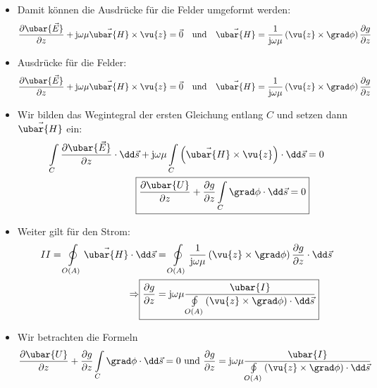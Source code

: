 \begin{itemize}
	\item Damit können die Ausdrücke für die Felder umgeformt werden:
	\begin{equation}
		\frac{\partial \ubar{\vec{E}}}{\partial z} + \mathrm{j}\omega\mu\vec{\ubar{H}} \times\vu{z} =\vec{0} \quad\text{und}\quad \vec{\ubar{H}}= \frac{1}{\mathrm{j}\omega\mu} \left(\vu{z}\times\grad \phi\right)\frac{\partial g}{\partial z}
	\end{equation}
	\item Ausdrücke für die Felder:
	\begin{equation}
		\frac{\partial \ubar{\vec{E}}}{\partial z} + \mathrm{j}\omega\mu\vec{\ubar{H}} \times\vu{z} =\vec{0} \quad\text{und}\quad \vec{\ubar{H}}= \frac{1}{\mathrm{j}\omega\mu} \left(\vu{z}\times\grad \phi\right)\frac{\partial g}{\partial z}
	\end{equation}
	\item Wir bilden das Wegintegral der ersten Gleichung entlang \(C\) und setzen dann \(\vec{\ubar{H}}\) ein:
	\begin{equation}\begin{split}
			\int\limits_C \frac{\partial \ubar{\vec{E}}}{\partial z} \cdot \dd \vec{s} + \mathrm{j}\omega\mu \int\limits_C\left(\vec{\ubar{H}} \times\vu{z}\right) \cdot \dd \vec{s} &= 0  \\
			\Aboxed{\frac{\partial  \ubar{U}}{\partial z} + \frac{\partial g}{\partial z} \int\limits_C\grad \phi \cdot \dd \vec{s} = 0}
	\end{split}\end{equation}
	\item Weiter gilt für den Strom:
	\begin{align}
		II = \oint\limits_{O(A)} \vec{\ubar{H}} \cdot \dd\vec{s} & = \oint\limits_{O(A)} \frac{1}{\mathrm{j}\omega\mu} \left(\vu{z}\times\grad \phi\right)\frac{\partial g}{\partial z} \cdot \dd\vec{s} \\
		\Rightarrow \Aboxed{\frac{\partial g}{\partial z}        & = \mathrm{j}\omega\mu \frac{ \ubar{I}}{\oint\limits_{O(A)} \left(\vu{z}\times\grad \phi\right) \cdot \dd\vec{s}}}
	\end{align}
	\item Wir betrachten die Formeln
	\begin{equation}
		\frac{\partial  \ubar{U}}{\partial z} + \frac{\partial g}{\partial z} \int\limits_C\grad \phi \cdot \dd \vec{s} = 0 \text{ und } \frac{\partial g}{\partial z} = \mathrm{j}\omega\mu \frac{ \ubar{I}}{\oint\limits_{O(A)} \left(\vu{z}\times\grad \phi\right) \cdot \dd\vec{s}}

\end{equation}
\end{itemize}
